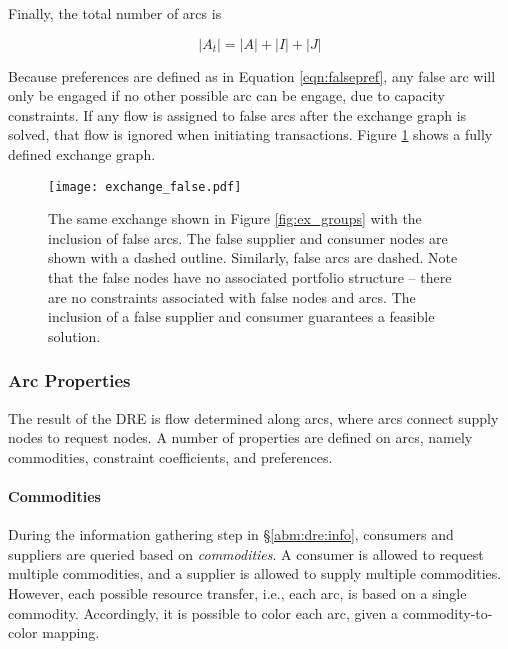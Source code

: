 Finally, the total number of arcs is

\begin{equation}
  \left|{A_t}\right| = \left|{A}\right| + \left|{I}\right| + \left|{J}\right|
\end{equation}

Because preferences are defined as in Equation \ref{eqn:falsepref}, any false
arc will only be engaged if no other possible arc can be engage, due to capacity
constraints. If any flow is assigned to false arcs after the exchange graph is
solved, that flow is ignored when initiating transactions. Figure
\ref{fig:ex_false} shows a fully defined exchange graph.

\begin{figure}
  \begin{center}
    \texttt{[image: exchange\_false.pdf]}
    \caption{The same exchange shown in Figure \ref{fig:ex_groups} with the
      inclusion of false arcs. The false supplier and consumer nodes are shown
      with a dashed outline. Similarly, false arcs are dashed. Note that the
      false nodes have no associated portfolio structure -- there are no
      constraints associated with false nodes and arcs. The inclusion of a false
      supplier and consumer guarantees a feasible solution.}
    \label{fig:ex_false}
  \end{center}
\end{figure}

\subsubsection{Arc Properties}\label{abm:dre:fctp:arcs}

The result of the DRE is flow determined along arcs, where arcs connect supply
nodes to request nodes. A number of properties are defined on arcs, namely
commodities, constraint coefficients, and preferences.

\paragraph{Commodities}

During the information gathering step in \S \ref{abm:dre:info}, consumers and
suppliers are queried based on \textit{commodities}. A consumer is allowed to
request multiple commodities, and a supplier is allowed to supply multiple
commodities. However, each possible resource transfer, i.e., each arc, is based
on a single commodity. Accordingly, it is possible to color each arc, given a
commodity-to-color mapping.

